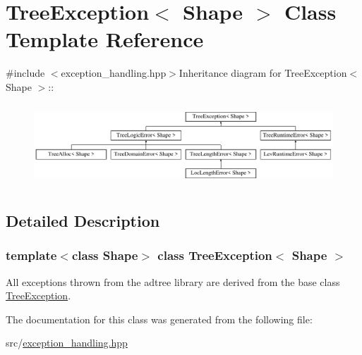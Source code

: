 \hypertarget{classTreeException}{
\section{TreeException$<$ Shape $>$ Class Template Reference}
\label{classTreeException}
}


{\ttfamily \#include $<$exception\_\-handling.hpp$>$}Inheritance diagram for TreeException$<$ Shape $>$::\begin{figure}[H]
\begin{center}
\leavevmode
\includegraphics[height=3.11111cm]{classTreeException}
\end{center}
\end{figure}


\subsection{Detailed Description}
\subsubsection*{template$<$class Shape$>$ class TreeException$<$ Shape $>$}

All exceptions thrown from the adtree library are derived from the base class \hyperlink{classTreeException}{TreeException}. 

The documentation for this class was generated from the following file:\begin{DoxyCompactItemize}
\item 
src/\hyperlink{exception__handling_8hpp}{exception\_\-handling.hpp}\end{DoxyCompactItemize}
